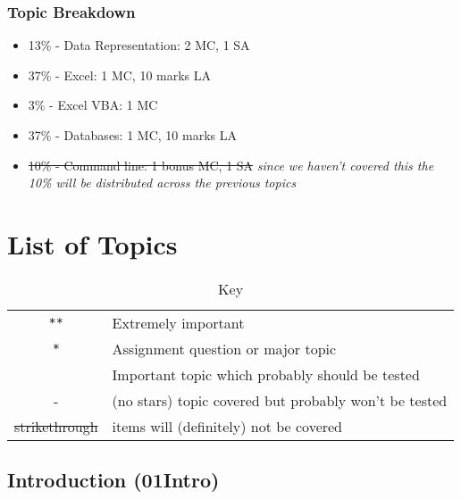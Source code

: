 \documentclass{article}%
\begin{document}
\subsubsection*{Topic Breakdown}

\begin{itemize}
\item  13\% - Data Representation: 2 MC, 1 SA
\item  37\% - Excel: 1 MC, 10 marks LA
\item  3\% - Excel VBA: 1 MC
\item  37\% - Databases: 1 MC, 10 marks LA
\item  \sout{10\% - Command line: 1 bonus MC, 1 SA} \textit{since we haven't covered this the 10\% will be distributed across the previous topics}
\end{itemize}



%
%
%
%
%
%
%
%


\section{List of Topics}


\begin{table}[h]
\caption{Key}
\begin{center}
\begin{tabular}{|c|l|}
\hline
{\tt ***} & Extremely important\\
 {\tt **} & Assignment question or major topic\\
  {\tt *} &Important topic which probably should be tested\\
    -& (no stars) topic covered but probably won't be tested\\
\sout{strikethrough} &  items will (definitely) not be covered \\
\hline
\end{tabular}
\end{center}
\label{default}
\end{table}%



\subsection{Introduction (01Intro)}
\end{document}
